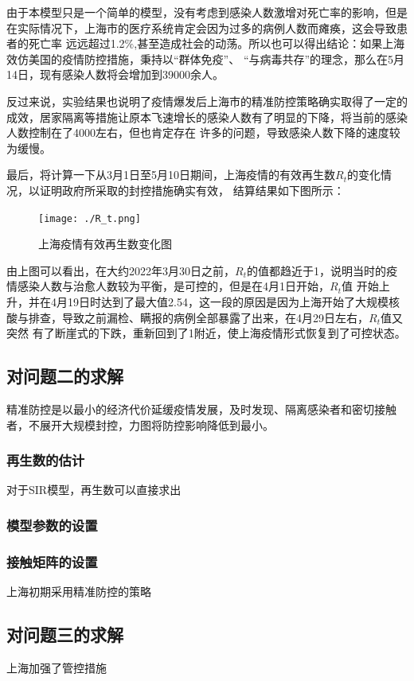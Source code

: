 \documentclass[bwprint]{gmcmthesis}
\numberwithin{figure}{section}
\begin{document}
\par 由于本模型只是一个简单的模型，没有考虑到感染人数激增对死亡率的影响，但是在实际情况下，上海市的医疗系统肯定会因为过多的病例人数而瘫痪，这会导致患者的死亡率
远远超过1.2$\%$,甚至造成社会的动荡。所以也可以得出结论：如果上海效仿美国的疫情防控措施，秉持以“群体免疫”、
“与病毒共存”的理念，那么在5月14日，现有感染人数将会增加到39000余人。
\par 反过来说，实验结果也说明了疫情爆发后上海市的精准防控策略确实取得了一定的成效，居家隔离等措施让原本飞速增长的感染人数有了明显的下降，将当前的感染人数控制在了4000左右，但也肯定存在
许多的问题，导致感染人数下降的速度较为缓慢。

\par 最后，将计算一下从3月1日至5月10日期间，上海疫情的有效再生数$R_t$的变化情况，以证明政府所采取的封控措施确实有效，
结算结果如下图所示：

\begin{figure}[!h]
    \centering
    \texttt{[image: ./R\_t.png]}
    \caption{上海疫情有效再生数变化图}
    \label{fig1}
\end{figure}

\par 由上图可以看出，在大约2022年3月30日之前，$R_t$的值都趋近于1，说明当时的疫情感染人数与治愈人数较为平衡，是可控的，但是在4月1日开始，$R_t$值
开始上升，并在4月19日时达到了最大值2.54，这一段的原因是因为上海开始了大规模核酸与排查，导致之前漏检、瞒报的病例全部暴露了出来，在4月29日左右，$R_t$值又突然
有了断崖式的下跌，重新回到了1附近，使上海疫情形式恢复到了可控状态。


\subsection{对问题二的求解}
精准防控是以最小的经济代价延缓疫情发展，及时发现、隔离感染者和密切接触者，不展开大规模封控，力图将防控影响降低到最小。
\subsubsection{再生数的估计}
对于SIR模型，再生数可以直接求出
\subsubsection{模型参数的设置}
\subsubsection{接触矩阵的设置}
上海初期采用精准防控的策略
\subsection{对问题三的求解}
上海加强了管控措施
\end{document}
